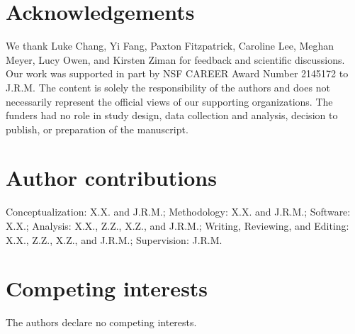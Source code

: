 \documentclass[10pt]{article}
\begin{document}
\section*{Acknowledgements}

We thank Luke Chang, Yi Fang, Paxton Fitzpatrick, Caroline Lee, Meghan Meyer,
Lucy Owen, and Kirsten Ziman for feedback and scientific discussions. Our work
was supported in part by NSF CAREER Award Number 2145172 to J.R.M. The content
is solely the responsibility of the authors and does not necessarily represent
the official views of our supporting organizations. The funders had no role in
study design, data collection and analysis, decision to publish, or preparation
of the manuscript.

\section*{Author contributions}

Conceptualization: X.X. and J.R.M.; Methodology: X.X. and J.R.M.; Software:
X.X.; Analysis: X.X., Z.Z., X.Z., and J.R.M.; Writing, Reviewing, and Editing:
X.X., Z.Z., X.Z., and J.R.M.; Supervision: J.R.M.

\section*{Competing interests}

The authors declare no competing interests.
\end{document}
